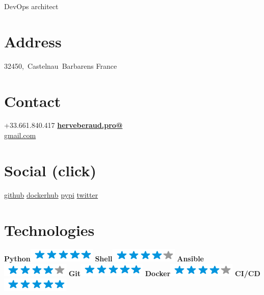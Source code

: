 \documentclass[]{friggeri-cv}
\begin{document}
{DevOps architect}


\begin{aside}
    \section{Address}
        32450,~Castelnau~Barbarens
        France
        ~
    \section{Contact}
        +33.661.840.417
        \href{mailto:herveberaud.pro@gmail.com}{\textbf{herveberaud.pro@}\\gmail.com}
        ~
    \section{Social (click)}
        \href{https://github.com/4383}{github}
        \href{https://hub.docker.com/r/4383}{dockerhub}
        \href{https://warehouse.python.org/user/4383/}{pypi}
        \href{https://twitter.com/4383hberaud}{twitter}
        ~
    \section{Technologies}
        \textbf{Python}\includegraphics[scale=0.40]{img/5stars.png}
        \textbf{Shell}\includegraphics[scale=0.40]{img/4stars.png}
        \textbf{Ansible}\includegraphics[scale=0.40]{img/4stars.png}
        \textbf{Git}\includegraphics[scale=0.40]{img/5stars.png}
        \textbf{Docker}\includegraphics[scale=0.40]{img/4stars.png}
        \textbf{CI/CD}\includegraphics[scale=0.40]{img/5stars.png}
        ~

\end{aside}
\end{document}
